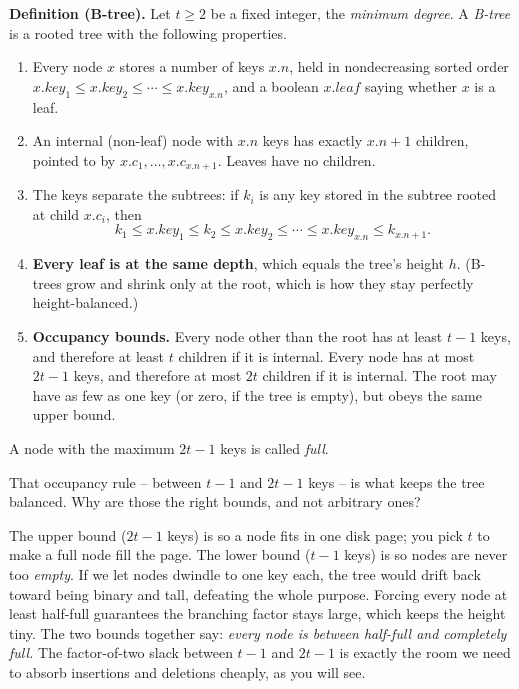 \begin{formalbox}
\textbf{Definition (B-tree).} Let $t \ge 2$ be a fixed integer, the \emph{minimum
degree}. A \emph{B-tree} is a rooted tree with the following properties.
\begin{enumerate}
\item Every node $x$ stores a number of keys $x.n$, held in nondecreasing sorted
order $x.\mathit{key}_1 \le x.\mathit{key}_2 \le \cdots \le x.\mathit{key}_{x.n}$,
and a boolean $x.\mathit{leaf}$ saying whether $x$ is a leaf.
\item An internal (non-leaf) node with $x.n$ keys has exactly $x.n + 1$ children,
pointed to by $x.c_1, \ldots, x.c_{x.n+1}$. Leaves have no children.
\item The keys separate the subtrees: if $k_i$ is any key stored in the subtree
rooted at child $x.c_i$, then
\[
k_1 \le x.\mathit{key}_1 \le k_2 \le x.\mathit{key}_2 \le \cdots \le
x.\mathit{key}_{x.n} \le k_{x.n+1}.
\]
\item \textbf{Every leaf is at the same depth}, which equals the tree's height
$h$. (B-trees grow and shrink only at the root, which is how they stay perfectly
height-balanced.)
\item \textbf{Occupancy bounds.} Every node other than the root has at least
$t-1$ keys, and therefore at least $t$ children if it is internal. Every node has
at most $2t-1$ keys, and therefore at most $2t$ children if it is internal. The
root may have as few as one key (or zero, if the tree is empty), but obeys the
same upper bound.
\end{enumerate}
A node with the maximum $2t-1$ keys is called \emph{full}.
\end{formalbox}

That occupancy rule -- between $t-1$ and $2t-1$ keys -- is what keeps the
tree balanced. Why are those the right bounds, and not arbitrary ones?

\begin{intuitionbox}
The upper bound ($2t-1$ keys) is so a node fits in one disk page; you pick $t$ to
make a full node fill the page. The lower bound ($t-1$ keys) is so nodes are never
too \emph{empty}. If we let nodes dwindle to one key each, the tree would drift
back toward being binary and tall, defeating the whole purpose. Forcing every node
at least half-full guarantees the branching factor stays large, which keeps the
height tiny. The two bounds together say: \emph{every node is between half-full and
completely full.} The factor-of-two slack between $t-1$ and $2t-1$ is exactly the
room we need to absorb insertions and deletions cheaply, as you will see.
\end{intuitionbox}

